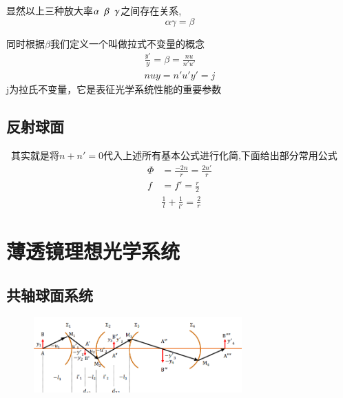 显然以上三种放大率$\alpha \hspace{0.2cm}  \beta\hspace{0.2cm}   \gamma$之间存在关系,
\begin{equation}
\alpha\gamma=\beta\tag{1.2.24}
\end{equation}
\begin{description}[leftmargin=0.7cm,style=nextline,nosep]%
    \item[拉式不变量] 同时根据$\beta$我们定义一个叫做拉式不变量的概念
    \begin{align}
    \frac{y'}{y}=\beta=\frac{nu}{n'u'}    \tag{1.2.25.bef 1}\\
      nuy=n'u'y'=j  \tag{1.2.25}
    \end{align}
    j为拉氏不变量，它是表征光学系统性能的重要参数
\end{description}

\subsection{反射球面}\
其实就是将$n+n'=0$代入上述所有基本公式进行化简,下面给出部分常用公式
\begin{align}
\Phi&=\frac{-2n}{r}=\frac{2n'}{r} \tag{1.2.26} \\
f&=f'=\frac{r}{2} \tag{1.2.27} \\
&\frac{1}{l}+\frac{1}{l'}=\frac{2}{r} \tag{1.2.28}
\end{align}
\section{薄透镜理想光学系统}
\subsection{共轴球面系统}
\begin{figure}[H]
    \centering
    \includegraphics[width=8cm]{img/1.4.png}
    \end{figure}
